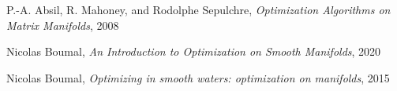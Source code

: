 \documentclass{article}
\begin{document}
\begin{thebibliography}{9}

    \label{OptMatrixManifolds}
  P.-A. Absil, R. Mahoney, and Rodolphe Sepulchre,
  \textit{Optimization Algorithms on Matrix Manifolds},
  2008
  
    \label{OptSmoothManifolds}
    Nicolas Boumal,
    \textit{An Introduction to Optimization on Smooth Manifolds},
    2020

    \label{OptBlog}
    Nicolas Boumal,
    \textit{Optimizing in smooth waters: optimization on manifolds},
    2015

\end{thebibliography}
\end{document}
